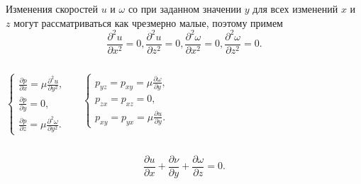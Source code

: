 \documentclass[ignoreonframetext,unicode]{beamer}
\begin{document}
\begin{frame}{}

Изменения скоростей $u$ и $\omega$ со при заданном значении $y$ для всех изменений $ x $ и $z$ могут рассматриваться как чрезмерно малые, поэтому примем
\[
\frac{\partial^2 u}{\partial x^2} = 0, 
\frac{\partial^2 u}{\partial z^2} = 0, 
\frac{\partial^2 \omega}{\partial x^2} = 0, 
\frac{\partial^2 \omega}{\partial z^2} = 0. 
\]

\begin{columns}

\begin{block}{}
\[
	\label{secondinitialeq}
	\begin{cases}
		\frac{\partial p }{\partial x} = \mu \frac{\partial^2 u}{\partial y^2}, \\
		\frac{\partial p }{\partial y} = 0, \\
		\frac{\partial p }{\partial z} = \mu \frac{\partial^2 \omega}{\partial y^2}.
	\end{cases}
\]
\end{block}

\begin{block}{}
\[
	\label{secinitialeq}
	\begin{cases}
		p_{yz} = p_{xy} = \mu \frac{\partial \omega}{\partial y}, \\
		p_{zx} = p_{xz} = 0, \\
		p_{xy} = p_{yx} = \mu \frac{\partial u}{\partial y}.
	\end{cases}
\]
\end{block}
\end{columns}

\begin{block}{}
\[
	\frac{\partial u}{\partial x} + \frac{\partial \nu}{\partial y} + \frac{\partial \omega}{\partial z} = 0.
\]
\end{block}

\end{frame}	
\end{document}
